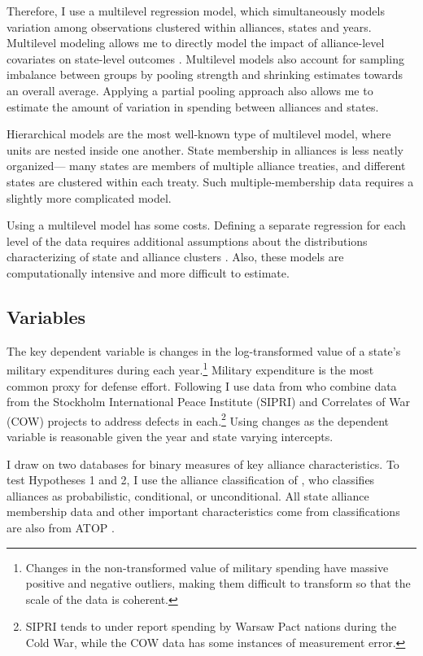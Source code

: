 \documentclass[12pt]{article}
\begin{document}
Therefore, I use a multilevel regression model, which simultaneously models variation among observations clustered within alliances, states and years. Multilevel modeling allows me to directly model the impact of alliance-level covariates on state-level outcomes \citep{GelmanHill2007}. Multilevel models also account for sampling imbalance between groups by pooling strength and shrinking estimates towards an overall average. Applying a partial pooling approach also allows me to estimate the amount of variation in spending between alliances and states. 

Hierarchical models are the most well-known type of multilevel model, where units are nested inside one another. State membership in alliances is less neatly organized--- many states are members of multiple alliance treaties, and different states are clustered within each treaty. Such multiple-membership data requires a slightly more complicated model. 

Using a multilevel model has some costs. Defining a separate regression for each level of the data requires additional assumptions about the distributions characterizing of state and alliance clusters \citep{McElreath2016}. Also, these models are computationally intensive and more difficult to estimate.

\subsection*{Variables} 

The key dependent variable is changes in the log-transformed value of a state's military expenditures during each year.\footnote{Changes in the non-transformed value of military spending have massive positive and negative outliers, making them difficult to transform so that the scale of the data is coherent.} Military expenditure is the most common proxy for defense effort. Following\citet{DigiuseppePoast2016} I use data from \citet{Nordhausetal2012} who combine data from the Stockholm International Peace Institute (SIPRI) and Correlates of War (COW) projects to address defects in each.\footnote{SIPRI tends to under report spending by Warsaw Pact nations during the Cold War, while the COW data has some instances of measurement error.} Using changes as the dependent variable is reasonable given the year and state varying intercepts. 

I draw on two databases for binary measures of key alliance characteristics. To test Hypotheses 1 and 2, I use the alliance classification of \citet{Benson2012}, who classifies alliances as probabilistic, conditional, or unconditional. All state alliance membership data and other important characteristics come from classifications are also from ATOP \citep{Leedsetal2002}. 
\end{document}
